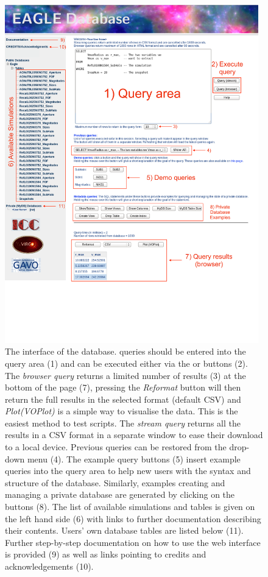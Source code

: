 \begin{figure}  [p]
\centering\includegraphics[width=0.98\textwidth]{figures/interface_example.pdf}
\caption{The interface of the \eagle database. \sql queries should be entered
  into the query area (1) and can be executed either via the 
  or  buttons (2). The \emph{browser query} returns a limited
  number of results (3) at the bottom of the page (7), pressing the
  \emph{Reformat} button will then return the full results in the selected
  format (default CSV) and \emph{Plot(VOPlot)} is a simple way to visualise the
  data. This is the easiest method to test \sql scripts. The \emph{stream query}
  returns all the results in a CSV format in a separate window to ease their
  download to a local device. Previous queries can be restored from the
  drop-down menu (4). The example query buttons (5) insert example \sql
  queries into the query area to help new users with the syntax and structure of
  the database. Similarly, examples creating and managing a private database are
  generated by clicking on the buttons (8). The list of available simulations
  and tables is given on the left hand side (6) with links to further
  documentation describing their contents.  Users' own database tables are
  listed below (11). Further step-by-step documentation on how to use the web
  interface is provided (9) as well as links pointing to credits and
  acknowledgements (10). }
\label{fig:interface_example}
\end{figure}


